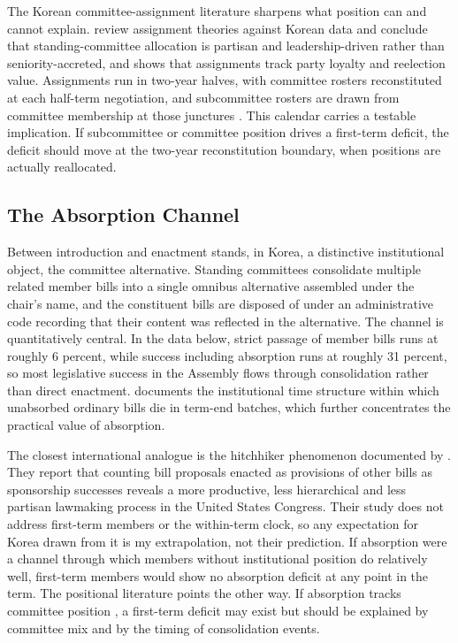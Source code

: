 \documentclass[11pt]{article}
\begin{document}
The Korean committee-assignment literature sharpens what position can and cannot explain. \citet{choi2018} review assignment theories against Korean data and conclude that standing-committee allocation is partisan and leadership-driven rather than seniority-accreted, and \citet{kang2024} shows that assignments track party loyalty and reelection value. Assignments run in two-year halves, with committee rosters reconstituted at each half-term negotiation, and subcommittee rosters are drawn from committee membership at those junctures \citep{shin2015}. This calendar carries a testable implication. If subcommittee or committee position drives a first-term deficit, the deficit should move at the two-year reconstitution boundary, when positions are actually reallocated.

\subsection{The Absorption Channel}

Between introduction and enactment stands, in Korea, a distinctive institutional object, the committee alternative. Standing committees consolidate multiple related member bills into a single omnibus alternative assembled under the chair's name, and the constituent bills are disposed of under an administrative code recording that their content was reflected in the alternative. The channel is quantitatively central. In the data below, strict passage of member bills runs at roughly 6 percent, while success including absorption runs at roughly 31 percent, so most legislative success in the Assembly flows through consolidation rather than direct enactment. \citet{ka2025b} documents the institutional time structure within which unabsorbed ordinary bills die in term-end batches, which further concentrates the practical value of absorption.

The closest international analogue is the hitchhiker phenomenon documented by \citet{casas2020}. They report that counting bill proposals enacted as provisions of other bills as sponsorship successes reveals a more productive, less hierarchical and less partisan lawmaking process in the United States Congress. Their study does not address first-term members or the within-term clock, so any expectation for Korea drawn from it is my extrapolation, not their prediction. If absorption were a channel through which members without institutional position do relatively well, first-term members would show no absorption deficit at any point in the term. The positional literature points the other way. If absorption tracks committee position \citep{kim2023, krutz2005}, a first-term deficit may exist but should be explained by committee mix and by the timing of consolidation events.
\end{document}
